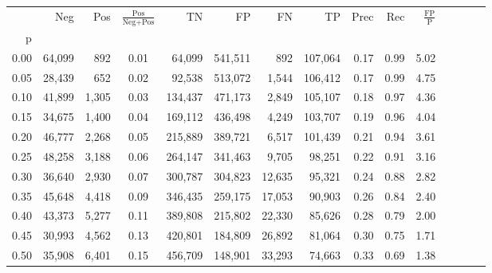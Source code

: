 \begin{tabular}{rrrcrrrrrrrrrrr}
\toprule
{} &     Neg &     Pos & $\frac{\text{Pos}}{\text{Neg}+\text{Pos}}$ &       TN &       FP &       FN &       TP &  Prec &   Rec & $\frac{\text{FP}}{\text{P}}$ \\
p    &         &         &                                            &          &          &          &          &       &       &                              \\
\midrule
0.00 &  64,099 &     892 &                                       0.01 &   64,099 &  541,511 &      892 &  107,064 &  0.17 &  0.99 &                         5.02 \\
0.05 &  28,439 &     652 &                                       0.02 &   92,538 &  513,072 &    1,544 &  106,412 &  0.17 &  0.99 &                         4.75 \\
0.10 &  41,899 &   1,305 &                                       0.03 &  134,437 &  471,173 &    2,849 &  105,107 &  0.18 &  0.97 &                         4.36 \\
0.15 &  34,675 &   1,400 &                                       0.04 &  169,112 &  436,498 &    4,249 &  103,707 &  0.19 &  0.96 &                         4.04 \\
0.20 &  46,777 &   2,268 &                                       0.05 &  215,889 &  389,721 &    6,517 &  101,439 &  0.21 &  0.94 &                         3.61 \\
0.25 &  48,258 &   3,188 &                                       0.06 &  264,147 &  341,463 &    9,705 &   98,251 &  0.22 &  0.91 &                         3.16 \\
0.30 &  36,640 &   2,930 &                                       0.07 &  300,787 &  304,823 &   12,635 &   95,321 &  0.24 &  0.88 &                         2.82 \\
0.35 &  45,648 &   4,418 &                                       0.09 &  346,435 &  259,175 &   17,053 &   90,903 &  0.26 &  0.84 &                         2.40 \\
0.40 &  43,373 &   5,277 &                                       0.11 &  389,808 &  215,802 &   22,330 &   85,626 &  0.28 &  0.79 &                         2.00 \\
0.45 &  30,993 &   4,562 &                                       0.13 &  420,801 &  184,809 &   26,892 &   81,064 &  0.30 &  0.75 &                         1.71 \\
0.50 &  35,908 &   6,401 &                                       0.15 &  456,709 &  148,901 &   33,293 &   74,663 &  0.33 &  0.69 &                         1.38 \\

\end{tabular}
